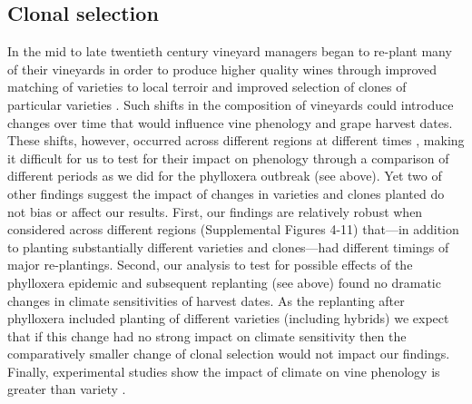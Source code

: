 \documentclass[12pt]{article}
\begin{document}
\subsection*{Clonal selection}
\noindent In the mid to late twentieth century vineyard managers began to re-plant many of their vineyards in order to produce higher quality wines through improved matching of varieties to local terroir and improved selection of clones of particular varieties \cite{Bouquet2002}. Such shifts in the composition of vineyards could introduce changes over time that would influence vine phenology and grape harvest dates. These shifts, however, occurred across different regions at different times \cite{Bouquet2002}, making it difficult for us to test for their impact on phenology through a comparison of different periods as we did for the phylloxera outbreak (see above). Yet two of other findings suggest the impact of changes in varieties and clones planted do not bias or affect our results. First, our findings are relatively robust when considered across different regions  (Supplemental Figures 4-11) that---in addition to planting substantially different varieties and clones---had different timings of major re-plantings. Second, our analysis to test for possible effects of the phylloxera epidemic and subsequent replanting (see above) found no dramatic changes in climate sensitivities of harvest dates. As the replanting after phylloxera included planting of different varieties (including hybrids) we expect that if this change had no strong impact on climate sensitivity then the comparatively smaller change of clonal selection would not impact our findings. Finally, experimental studies show the impact of climate on vine phenology is greater than variety \cite{vanleeuwen2004}.
\end{document}
